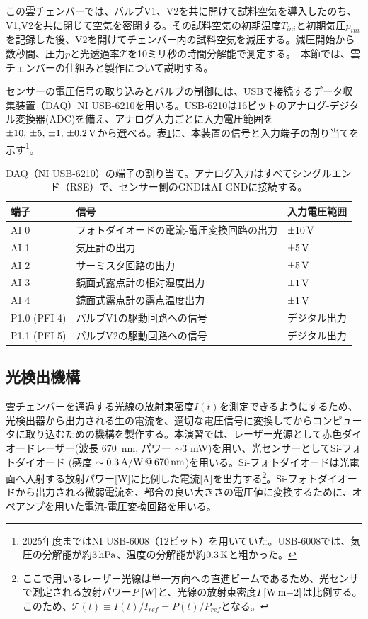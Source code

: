 \documentclass{ltjsarticle}
\begin{document}
この雲チェンバーでは、バルブV1、V2を共に開けて試料空気を導入したのち、V1,V2を共に閉じて空気を密閉する。その試料空気の初期温度$T_{ini}$と初期気圧$p_{ini}$を記録した後、V2を開けてチェンバー内の試料空気を減圧する。減圧開始から数秒間、圧力$p$と光透過率$\mathcal{T}$を10ミリ秒の時間分解能で測定する。　本節では、雲チェンバーの仕組みと製作について説明する。

センサーの電圧信号の取り込みとバルブの制御には、USBで接続するデータ収集装置（DAQ）NI USB-6210を用いる。USB-6210は16ビットのアナログ-デジタル変換器(ADC)を備え、アナログ入力ごとに入力電圧範囲を$\pm10,\,\pm5,\,\pm1,\,\pm0.2\,\rm V$から選べる。表\ref{tab:channels}に、本装置の信号と入力端子の割り当てを示す\footnote{2025年度まではNI USB-6008（12ビット）を用いていた。USB-6008では、気圧の分解能が約$3\,\rm hPa$、温度の分解能が約$0.3\,\rm K$と粗かった。}。
\begin{table}[h]
 \begin{center}
 \caption{DAQ（NI USB-6210）の端子の割り当て。アナログ入力はすべてシングルエンド（RSE）で、センサー側のGNDはAI GNDに接続する。}\label{tab:channels}
 \begin{tabular}{lll}
 \toprule
 端子 & 信号 & 入力電圧範囲 \\
 \midrule
 AI 0 & フォトダイオードの電流-電圧変換回路の出力 & $\pm10\,\rm V$ \\
 AI 1 & 気圧計の出力 & $\pm5\,\rm V$ \\
 AI 2 & サーミスタ回路の出力 & $\pm5\,\rm V$ \\
 AI 3 & 鏡面式露点計の相対湿度出力 & $\pm1\,\rm V$ \\
 AI 4 & 鏡面式露点計の露点温度出力 & $\pm1\,\rm V$ \\
 P1.0 (PFI 4) & バルブV1の駆動回路への信号 & デジタル出力 \\
 P1.1 (PFI 5) & バルブV2の駆動回路への信号 & デジタル出力 \\
 \bottomrule
 \end{tabular}
 \end{center}
\end{table}


\subsection{光検出機構}
雲チェンバーを通過する光線の放射束密度$I(t)$を測定できるようにするため、光検出器から出力される生の電流を、適切な電圧信号に変換してからコンピュータに取り込むための機構を製作する。本演習では、レーザー光源として赤色ダイオードレーザー(波長 670~nm, パワー $\sim$3 mW)を用い、光センサーとしてSi-フォトダイオード (感度 $\rm{\sim0.3\,A/W \, @ \,670\,nm}$)を用いる。Si-フォトダイオードは光電面へ入射する放射パワー[W]に比例した電流[A]を出力する\footnote{ここで用いるレーザー光線は単一方向への直進ビームであるため、光センサで測定される放射パワー$P\,\rm [W]$と、光線の放射束密度$I\,\rm [W\,m{-2}]$は比例する。このため、$\mathcal{T}(t) \equiv I(t)/I_{ref}= P(t)/P_{ref}$となる。}。Si-フォトダイオードから出力される微弱電流を、都合の良い大きさの電圧値に変換するために、オペアンプを用いた電流-電圧変換回路を用いる。
\end{document}
